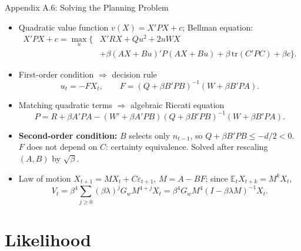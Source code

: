\documentclass[10pt]{beamer}
\newcommand{\E}{\mathbb{E}}
\begin{document}
\begin{frame}{Appendix A.6: Solving the Planning Problem}
  \small
  \begin{itemize}
    \item Quadratic value function $v(X)=X'PX+c$; Bellman equation:
      \begin{align*} X'PX+c=\max_u\Big\{&X'RX+Qu^2+2uWX\\ &+\beta(AX+Bu)'P(AX+Bu)+\beta\,\mathrm{tr}(C'PC)+\beta c\Big\}. \end{align*}
    \item First-order condition $\Rightarrow$ decision rule
      \[ u_t=-FX_t,\qquad F=(Q+\beta B'PB)^{-1}(W+\beta B'PA). \]
    \item Matching quadratic terms $\Rightarrow$ algebraic Riccati equation
      \[ P=R+\beta A'PA-(W'+\beta A'PB)(Q+\beta B'PB)^{-1}(W+\beta B'PA). \]
    \item \textbf{Second-order condition:} $B$ selects only $n_{t-1}$, so $Q+\beta B'PB\le-d/2<0$. $F$ does not depend on $C$: \alert{certainty equivalence}. Solved after rescaling $(A,B)$ by $\sqrt\beta$.
    \item Law of motion $X_{t+1}=MX_t+C\varepsilon_{t+1}$, $M=A-BF$; since $\E_tX_{t+k}=M^kX_t$,
      \[ V_t=\beta^4\sum_{j\ge0}(\beta\lambda)^jG_wM^{4+j}X_t=\beta^4G_wM^4(I-\beta\lambda M)^{-1}X_t . \]
  \end{itemize}
\end{frame}

\section{Likelihood}
\end{document}
